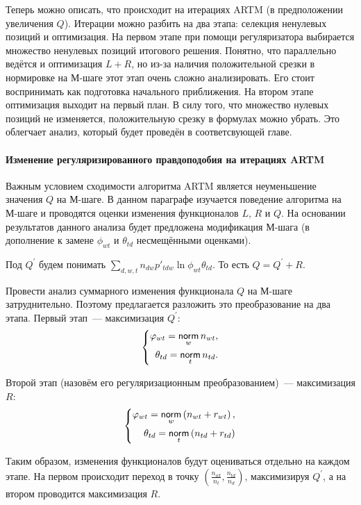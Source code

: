 \documentclass[12pt, twoside]{article}
\begin{document}
Теперь можно описать, что происходит на итерациях ARTM (в предположении увеличения $Q$). Итерации можно разбить на два этапа: селекция ненулевых позиций и оптимизация. На первом этапе при помощи регуляризатора выбирается множество ненулевых позиций итогового решения. Понятно, что параллельно ведётся и оптимизация $L + R$, но из-за наличия положительной срезки в нормировке на М-шаге этот этап очень сложно анализировать. Его стоит воспринимать как подготовка начального приближения. На втором этапе оптимизация выходит на первый план. В силу того, что множество нулевых позиций не изменяется, положительную срезку в формулах можно убрать. Это облегчает анализ, который будет проведён в соответсвующей главе.

\paragraph{Изменение регуляризированного правдоподобия на итерациях ARTM}
Важным условием сходимости алгоритма ARTM является неуменьшение значения $Q$ на М-шаге. В данном параграфе изучается поведение алгоритма на М-шаге и проводятся оценки изменения функционалов $L$, $R$ и $Q$. На основании результатов данного анализа будет предложена  модификация М-шага (в дополнение к замене $\phi_{wt}$ и $\theta_{td}$ несмещёнными оценками).

Под $Q^{\prime}$ будем понимать $\sum\limits_{d, w, t} n_{dw} p'_{tdw} \ln{\phi_{wt}\theta_{td}}$. То есть $Q = Q^{\prime} +  R$.

Провести анализ суммарного изменения функционала $Q$ на М-шаге затруднительно. Поэтому предлагается разложить это преобразование на два этапа. Первый этап~--- максимизация $Q^{\prime}$:
\[
\left\{
	\begin{aligned}
		\varphi_{wt} = \mathop{\mathsf{norm}}\limits_w  n_{wt},\\
		\theta_{td} = \mathop{\mathsf{norm}}\limits_t n_{td} .
	\end{aligned}
\right.
\]

Второй этап (назовём его регуляризационным преобразованием)~--- максимизация $R$:
\[
\left\{
\begin{aligned}
 \varphi_{wt}  = \mathop{\mathsf{norm}}\limits_w \left(n_{wt} + r_{wt} \right),\\
\theta_{td} = \mathop{\mathsf{norm}}\limits_t  \left(n_{td} + r_{td}\right)
\end{aligned}
\right.
\]

Таким образом, изменения функционалов будут оцениваться  отдельно на каждом этапе. На первом происходит переход в точку $\left(\frac{n_{wt}}{n_t}, \frac{n_{td}}{n_d}\right)$, максимизируя $Q^{\prime}$, а на втором проводится максимизация $R$. 
\end{document}
